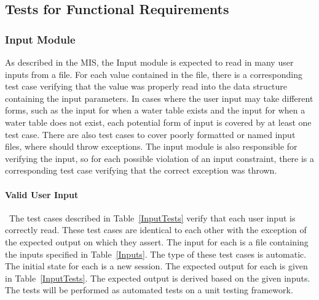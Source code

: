 \documentclass[12pt, titlepage]{article}
\begin{document}
\subsection{Tests for Functional Requirements}

\subsubsection{Input Module}

As described in the MIS, the Input module is expected to read in many user 
inputs from a file. For each value contained in the file, there is a 
corresponding test case verifying that the value was properly read into the 
data structure containing the input parameters. In cases where the user input 
may take different forms, such as the input for when a water table exists and 
the input for when a water table does not exist, each potential form of input 
is covered by at least one test case. There are also test cases to cover poorly 
formatted or named input files, where \progname{} should throw exceptions. The 
input module is also responsible for 
verifying the input, so for each possible violation of an input constraint, 
there is a corresponding test case verifying that the correct exception was 
thrown.

\paragraph{Valid User Input}

~\newline \noindent The test cases described in Table~\ref{InputTests} 
verify that each user input is correctly read. These test cases are identical 
to each other with the exception of the expected output on which they assert. 
The input for each is a file containing the inputs specified in 
Table~\ref{Inputs}. The type of these test cases is automatic. The initial 
state for each is a new session. The expected output for each is given in 
Table~\ref{InputTests}. The expected output is derived based on the given 
inputs. The tests will be performed as automated tests on a unit testing 
framework.
\end{document}
